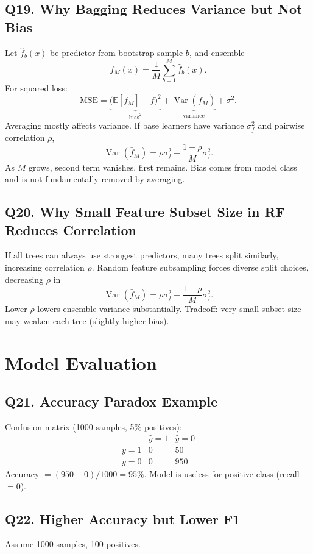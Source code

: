 \documentclass[11pt]{article}
\newcommand{\E}{\mathbb{E}}
\newcommand{\1}{\mathbf{1}}
\begin{document}
\subsection*{Q19. Why Bagging Reduces Variance but Not Bias}
Let $\hat f_b(x)$ be predictor from bootstrap sample $b$, and ensemble
\[
\bar f_M(x)=\frac1M\sum_{b=1}^M\hat f_b(x).
\]
For squared loss:
\[
\text{MSE}=\underbrace{\big(\E[\bar f_M]-f\big)^2}_{\text{bias}^2}+\underbrace{\operatorname{Var}(\bar f_M)}_{\text{variance}}+\sigma^2.
\]
Averaging mostly affects variance. If base learners have variance $\sigma_f^2$ and pairwise correlation $\rho$,
\[
\operatorname{Var}(\bar f_M)=\rho\sigma_f^2+\frac{1-\rho}{M}\sigma_f^2.
\]
As $M$ grows, second term vanishes, first remains. Bias comes from model class and is not fundamentally removed by averaging.

\subsection*{Q20. Why Small Feature Subset Size in RF Reduces Correlation}
If all trees can always use strongest predictors, many trees split similarly, increasing correlation $\rho$.
Random feature subsampling forces diverse split choices, decreasing $\rho$ in
\[
\operatorname{Var}(\bar f_M)=\rho\sigma_f^2+\frac{1-\rho}{M}\sigma_f^2.
\]
Lower $\rho$ lowers ensemble variance substantially. Tradeoff: very small subset size may weaken each tree (slightly higher bias).

\section{Model Evaluation}

\subsection*{Q21. Accuracy Paradox Example}
Confusion matrix (1000 samples, 5\% positives):
\[
\begin{array}{c|cc}
&\hat y=1&\hat y=0\\\hline
y=1&0&50\\
y=0&0&950
\end{array}
\]
Accuracy $=(950+0)/1000=95\%$.
Model is useless for positive class (recall $=0$).

\subsection*{Q22. Higher Accuracy but Lower F1}
Assume 1000 samples, 100 positives.
\end{document}
